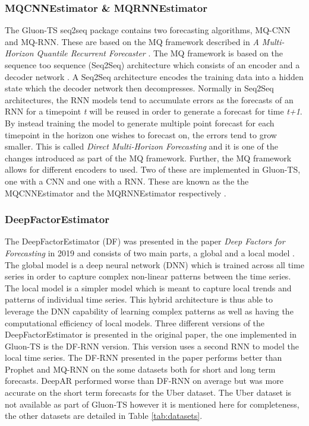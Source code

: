 \subsubsection{MQCNNEstimator \& MQRNNEstimator}
The Gluon-TS seq2seq package contains two forecasting algorithms, MQ-CNN and MQ-RNN. These are based on the MQ framework described in \textit{A Multi-Horizon Quantile Recurrent Forecaster} \cite{wen_multi-horizon_2018}. The MQ framework is based on the sequence too sequence (Seq2Seq) architecture  which consists of an encoder and a decoder network \cite{seq2seq}. A Seq2Seq architecture encodes the training data into a hidden state which the decoder network then decompresses. Normally in Seq2Seq architectures, the RNN models tend to accumulate errors as the forecasts of an RNN for a timepoint \textit{t} will be reused in order to generate a forecast for time \textit{t+1}. By instead training the model to generate multiple point forecast for each timepoint in the horizon one wishes to forecast on, the errors tend to grow smaller. This is called \textit{Direct Multi-Horizon Forecasting} and it is one of the changes introduced as part of the MQ framework. Further, the MQ framework allows for different encoders to used. Two of these are implemented in Gluon-TS, one with a CNN and one with a RNN. These are known as the the MQCNNEstimator and the MQRNNEstimator respectively \cite{gluonts-website}.

\subsubsection{DeepFactorEstimator}
The DeepFactorEstimator (DF) was presented in the paper \textit{Deep Factors for Forecasting} in 2019 and consists of two main parts, a global and a local model \cite{wang_deep_2019}. The global model is a deep neural network (DNN) which is trained across all time series in order to capture complex non-linear patterns between the time series. The local model is a simpler model which is meant to capture local trends and patterns of individual time series. This hybrid architecture is thus able to leverage the DNN capability of learning complex patterns as well as having the computational efficiency of local models. Three different versions of the DeepFactorEstimator is presented in the original paper, the one implemented in Gluon-TS is the DF-RNN version. This version uses a second RNN to model the local time series. The DF-RNN presented in the paper performs better than Prophet and MQ-RNN on the some datasets both for short and long term forecasts. DeepAR performed worse than DF-RNN on average but was more accurate on the short term forecasts for the Uber dataset. The Uber dataset is not available as part of Gluon-TS however it is mentioned here for completeness, the other datasets are detailed in Table \ref{tab:datasets}.

